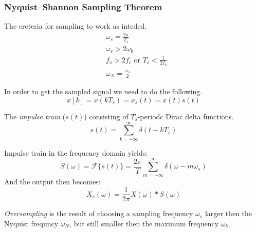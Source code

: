 \subsubsection{Nyquist–Shannon Sampling Theorem}
The creteria for sampling to work as inteded.
\begin{align*}
    &\omega_s =\frac{2\pi}{T_s} \\
    &\omega_s > 2\omega_b \\
    &f_s > 2f_c \text{ or } T_s < \frac{1}{2f_b} \\
    &\omega_N = \frac{\omega_s}{2}
\end{align*}


In order to get the sampled signal we need to do the following.
\begin{equation*}
    x[k]=x(kT_s)=x_s(t)=x(t)s(t)
\end{equation*}

The \textit{impulse train} ($s(t)$) consisting of $T_s$-periodc Dirac delta functions.
\begin{equation*}
    s(t) = \sum_{k=-\infty}^{\infty} \delta(t-kT_s)
\end{equation*}

Impulse train in the frequency domain yields:
\begin{equation*}
    S(\omega) = \mathcal{F}\{s(t)\} = \frac{2\pi}{T} \sum_{m=-\infty}^{\infty} \delta(\omega-m\omega_s)
\end{equation*}
And the output then becomes:
\begin{equation*}
    X_s(\omega) = \frac{1}{2\pi}X(\omega) * S(\omega)
\end{equation*}

\textit{Oversampling} is the result of choosing a sampling frequency $\omega_s$ larger then the Nyquist frequncy $\omega_N$,
but still smaller then the maximum frequency $\omega_b$.

